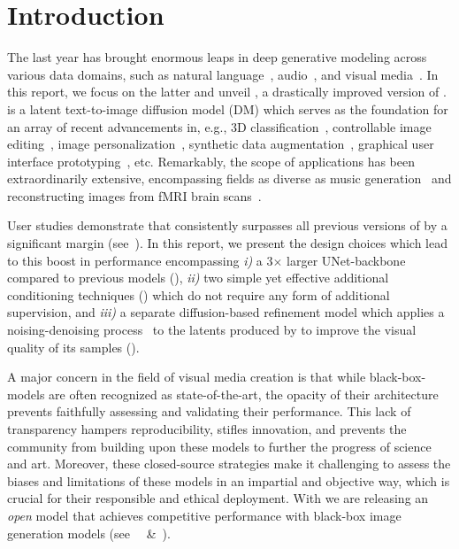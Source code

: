 \documentclass{article}
\begin{document}
\section{Introduction}
\label{sec:intro}
%
%
The last year has brought enormous leaps in deep generative modeling across various data domains, such as natural language~\cite{touvron2023llama}, audio~\cite{huang2023make}, and visual media~\citep{rombach2021high,ramesh2022hierarchical,saharia2022photorealistic,singer2022make,ho2022imagen,blattmann2023align, esser2023structure}.
%
In this report, we focus on the latter and unveil \modelname, a drastically improved version of \sd. 
\sd is a latent text-to-image diffusion model (DM) which serves as the foundation for an array of recent advancements in, e.g., 
%
3D classification~\cite{shen2023diffclip}, controllable image editing~\cite{zhang2023adding}, 
%
image personalization~\cite{gal2022image}, synthetic data augmentation~\cite{stockl2022evaluating}, 
%
graphical user interface prototyping~\cite{wei2023boosting}, etc. Remarkably, the scope of applications has been extraordinarily extensive, encompassing fields as diverse as music generation~\cite{Forsgren_Martiros_2022} and reconstructing images from fMRI brain scans~\cite{takagi2023high}.

User studies demonstrate that \modelname consistently surpasses all previous versions of \sd by a significant margin (see~).
%
%
In this report, we present 
%
the design choices which lead to this boost in performance encompassing \emph{i)} a 3$\times$ larger UNet-backbone 
%
compared to previous \sd models (), \emph{ii)} 
%
two simple yet effective additional conditioning techniques () which do not require any form of additional supervision, and \emph{iii)} a separate diffusion-based refinement model which applies a noising-denoising process~\cite{meng2021sdedit} to the latents produced by \modelname to improve the visual quality of its samples ().  

%
A major concern in the field of visual media creation is that while black-box-models 
%
are often 
%
recognized as state-of-the-art, the opacity of their architecture 
%
prevents faithfully assessing and validating their performance. This lack of transparency hampers reproducibility, stifles innovation, and prevents the community from building upon these models to further the progress of science and art. Moreover, 
%
these closed-source strategies make it challenging to assess the biases and limitations of these models in an impartial and objective way, which is crucial for their responsible and ethical deployment. With \modelname we are releasing an \emph{open} model that achieves competitive performance with black-box image generation models (see ~~\&~).
\end{document}
